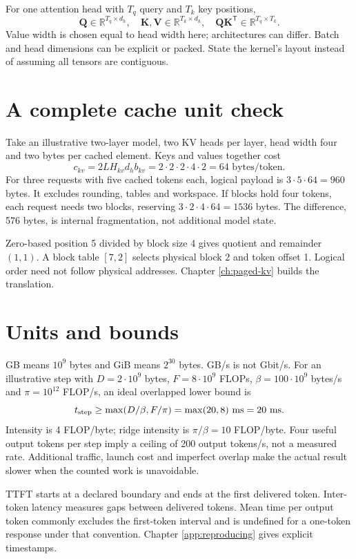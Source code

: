 For one attention head with $T_q$ query and $T_k$ key positions,
\[
 \mathbf{Q}\in\mathbb{R}^{T_q\times d_h},\quad
 \mathbf{K},\mathbf{V}\in\mathbb{R}^{T_k\times d_h},\quad
 \mathbf{QK}^{\mathsf T}\in\mathbb{R}^{T_q\times T_k}.
\]
Value width is chosen equal to head width here; architectures can differ.
Batch and head dimensions can be explicit or packed. State the kernel's
layout instead of assuming all tensors are contiguous.

\section{A complete cache unit check}
Take an illustrative two-layer model, two KV heads per layer, head width
four and two bytes per cached element. Keys and values together cost
\[
 c_{kv}=2LH_{kv}d_hb_{kv}
       =2\cdot2\cdot2\cdot4\cdot2=64\text{ bytes/token}.
\]
For three requests with five cached tokens each, logical payload is
$3\cdot5\cdot64=960$ bytes. It excludes rounding, tables and workspace.
If blocks hold four tokens, each request needs two blocks, reserving
$3\cdot2\cdot4\cdot64=1536$ bytes. The difference, 576 bytes, is internal
fragmentation, not additional model state.

Zero-based position 5 divided by block size 4 gives quotient and remainder
$(1,1)$. A block table $[7,2]$ selects physical block 2 and token offset 1.
Logical order need not follow physical addresses. Chapter
\ref{ch:paged-kv} builds the translation.

\section{Units and bounds}
GB means $10^9$ bytes and GiB means $2^{30}$ bytes. GB/s is not Gbit/s.
For an illustrative step with $D=2\cdot10^9$ bytes,
$F=8\cdot10^9$ FLOPs, $\beta=100\cdot10^9$ bytes/s and
$\pi=10^{12}$ FLOP/s, an ideal overlapped lower bound is
\[
 t_{\rm step}\geq\max(D/\beta,F/\pi)
              =\max(20,8)\text{ ms}=20\text{ ms}.
\]
Intensity is 4 FLOP/byte; ridge intensity is $\pi/\beta=10$ FLOP/byte.
Four useful output tokens per step imply a ceiling of 200 output tokens/s,
not a measured rate. Additional traffic, launch cost and imperfect overlap
make the actual result slower when the counted work is unavoidable.

TTFT starts at a declared boundary and ends at the first delivered token.
Inter-token latency measures gaps between delivered tokens. Mean time per
output token commonly excludes the first-token interval and is undefined
for a one-token response under that convention. Chapter
\ref{app:reproducing} gives explicit timestamps.

